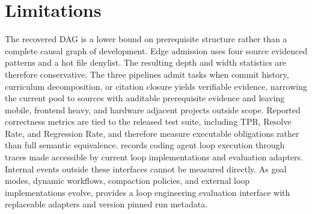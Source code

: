 \section*{Limitations}

The recovered DAG is a lower bound on prerequisite structure rather than a complete causal graph of development. Edge admission uses four source evidenced patterns and a hot file denylist. The resulting depth and width statistics are therefore conservative. 
The three pipelines admit tasks when commit history, curriculum decomposition, or citation closure yields verifiable evidence, narrowing the current pool to sources with auditable prerequisite evidence and leaving mobile, frontend heavy, and hardware adjacent projects outside scope.
Reported correctness metrics are tied to the released test suite, including TPR, Resolve Rate, and Regression Rate, and therefore measure executable obligations rather than full semantic equivalence.
\lhb{} records coding agent loop execution through traces made accessible by current loop implementations and evaluation adapters. Internal events outside these interfaces cannot be measured directly.
As goal modes, dynamic workflows, compaction policies, and external loop implementations evolve, \lhb{} provides a loop engineering evaluation interface with replaceable adapters and version pinned run metadata.
